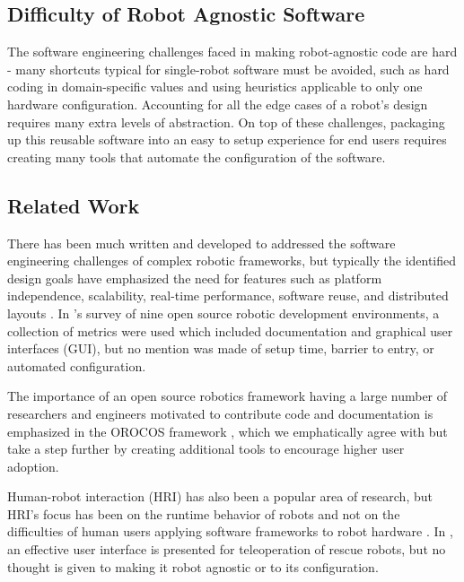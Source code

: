 \documentclass[10pt,journal,compsoc]{joser1}
\begin{document}
{%
\subsection{Difficulty of Robot Agnostic Software}

The software engineering challenges faced in making robot-agnostic code are hard - many shortcuts typical for single-robot software must be avoided, such as hard coding in domain-specific values and using heuristics applicable to only one hardware configuration. Accounting for all the edge cases of a robot's design requires many extra levels of abstraction. On top of these challenges, packaging up this reusable software into an easy to setup experience for end users requires creating many tools that automate the configuration of the software.

\subsection{Related Work}

There has been much written and developed to addressed the software engineering challenges of complex robotic frameworks, but typically the identified design goals have emphasized the need for features such as platform independence, scalability, real-time performance, software reuse, and distributed layouts \cite{realtime_framework, collett2005player, kramer2007development}. In \cite{kramer2007development}'s survey of nine open source robotic development environments, a collection of metrics were used which included documentation and graphical user interfaces (GUI), but no mention was made of setup time, barrier to entry, or automated configuration. 

The importance of an open source robotics framework having a large number of researchers and engineers motivated to contribute code and documentation is emphasized in the OROCOS framework \cite{bruyninckx2001open}, which we emphatically agree with but take a step further by creating additional tools to encourage higher user adoption.
  
Human-robot interaction (HRI) has also been a popular area of research, but HRI's focus has been on the runtime behavior of robots and not on the difficulties of human users applying software frameworks to robot hardware \cite{hci_metrics, yancotaxonomy, goodrichseven}. In \cite{rescueRobots}, an effective user interface is presented for teleoperation of rescue robots, but no thought is given to making it robot agnostic or to its configuration. 

}
\end{document}
